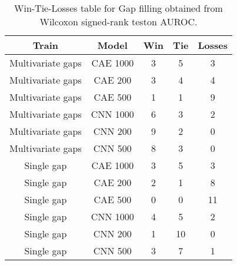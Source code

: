 \begin{table}[H]
\centering
\begin{tabular}{|c|c|c|c|c|}

    \textbf{Train} & \textbf{Model} &  \textbf{Win} &  \textbf{Tie} &  \textbf{Losses} \\
\hline

 Multivariate gaps &       CAE 1000 &             3 &             5 &                3 \\
\hline
 Multivariate gaps &        CAE 200 &             3 &             4 &                4 \\
\hline
 Multivariate gaps &        CAE 500 &             1 &             1 &                9 \\
\hline
 Multivariate gaps &       CNN 1000 &             6 &             3 &                2 \\
\hline
 Multivariate gaps &        CNN 200 &             9 &             2 &                0 \\
\hline
 Multivariate gaps &        CNN 500 &             8 &             3 &                0 \\
\hline
        Single gap &       CAE 1000 &             3 &             5 &                3 \\
\hline
        Single gap &        CAE 200 &             2 &             1 &                8 \\
\hline
        Single gap &        CAE 500 &             0 &             0 &               11 \\
\hline
        Single gap &       CNN 1000 &             4 &             5 &                2 \\
\hline
        Single gap &        CNN 200 &             1 &            10 &                0 \\
\hline
        Single gap &        CNN 500 &             3 &             7 &                1 \\
\hline

\end{tabular}
\caption{Win-Tie-Losses table for Gap filling obtained from Wilcoxon signed-rank teston AUROC.}
\label{tab:gap_filling_model_training_data_comparison}
\end{table}